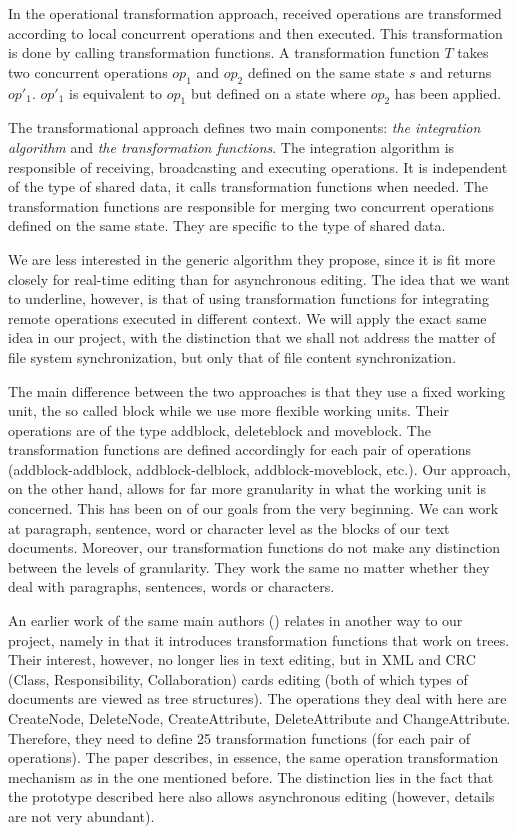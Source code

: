 In the operational transformation approach, received operations are transformed according to
local concurrent operations and then executed. This transformation is done by calling
transformation functions. A transformation function $T$ takes two concurrent operations $op_1$ and
$op_2$ defined on the same state $s$ and returns $op'_{1}$. $op'_{1}$ is equivalent to $op_1$ but
defined on a state where $op_2$ has been applied.

The transformational approach defines two main components: \emph{the integration algorithm} and
\emph{the transformation functions}. The integration algorithm is responsible of receiving,
broadcasting and executing operations. It is independent of the type of shared data, it
calls transformation functions when needed. The transformation functions are responsible for
merging two concurrent operations defined on the same state. They are specific to the type
of shared data.

We are less interested in the generic algorithm they propose, since it is fit more closely
for real-time editing than for asynchronous editing. The idea that we want to underline, however, is that
of using transformation functions for integrating remote operations executed in different context.
We will apply the exact same idea in our project, with the distinction that we shall not address
the matter of file system synchronization, but only that of file content synchronization.

The main difference between the two approaches is that they use a fixed working unit, the so
called block while we use more flexible working units. Their operations are of the type addblock,
deleteblock and moveblock. The transformation functions are defined accordingly for each pair of
operations (addblock-addblock, addblock-delblock, addblock-moveblock, etc.). Our approach, on
the other hand, allows for far more granularity in what the working unit is concerned. This has
been on of our goals from the very beginning. We can work at paragraph, sentence, word or
character level as the blocks of our text documents. Moreover, our transformation functions do
not make any distinction between the levels of granularity. They work the same no matter whether
they deal with paragraphs, sentences, words or characters.

An earlier work of the same main authors (\cite{molli02}) relates in another way to our project,
namely in that it introduces transformation functions that work on trees. Their interest, however,
no longer lies in text editing, but in XML and CRC (Class, Responsibility, Collaboration) cards
editing (both of which types of documents are viewed as tree structures). The operations they
deal with here are CreateNode, DeleteNode, CreateAttribute, DeleteAttribute and ChangeAttribute.
Therefore, they need to define 25 transformation functions (for each pair of operations). The
paper describes, in essence, the same operation transformation mechanism as in the one mentioned
before. The distinction lies in the fact that the prototype described here also allows asynchronous
editing (however, details are not very abundant).

